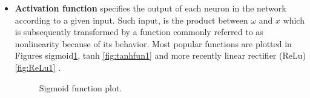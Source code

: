 \begin{itemize}
\item \textbf{Activation function} specifies the output of each neuron in the network according to a given input. Such input, is the product between $\omega$ and $x$ which is subsequently transformed by a function commonly referred to as nonlinearity because of its behavior. Most popular functions are plotted in Figures  sigmoid\ref{fig:Sigfun1}, tanh \ref{fig:tanhfun1} and more recently linear rectifier (ReLu) \ref{fig:ReLu1} \cite{glorot2011deep}. 

\begin{figure}[!tb] 
\centering 
{}
\caption{Sigmoid function plot.}
\label{fig:Sigfun1} 
\end{figure}


\end{itemize}
